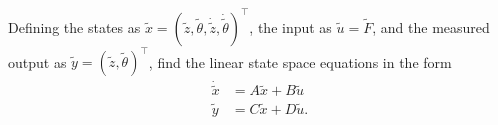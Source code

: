 Defining the states as $\tilde{x}=(\tilde{z},\tilde{\theta},\dot{\tilde{z}},\dot{\tilde{\theta}})^{\top}$, the input as $\tilde{u}=\tilde{F}$, and the measured output as $\tilde{y}=(\tilde{z},\tilde{\theta})^{\top}$, find the linear state space equations in the form
\begin{align*}
	\dot{\tilde{x}} &= A\tilde{x} + B\tilde{u} \\
	\tilde{y} &= C\tilde{x} + D\tilde{u}.
\end{align*} 
